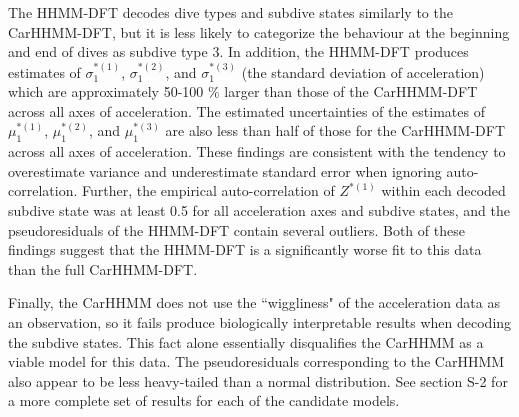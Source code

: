 The HHMM-DFT decodes dive types and subdive states similarly to the CarHHMM-DFT, but it is less likely to categorize the behaviour at the beginning and end of dives as subdive type 3. In addition, the HHMM-DFT produces estimates of $\sigma_1^{*(1)}$, $\sigma_1^{*(2)}$, and $\sigma_1^{*(3)}$ (the standard deviation of acceleration) which are approximately 50-100 \% larger than those of the CarHHMM-DFT across all axes of acceleration. The estimated uncertainties of the estimates of $\mu_1^{*(1)}$, $\mu_1^{*(2)}$, and $\mu_1^{*(3)}$ are also less than half of those for the CarHHMM-DFT across all axes of acceleration. These findings are consistent with the tendency to overestimate variance and underestimate standard error when ignoring auto-correlation. Further, the empirical auto-correlation of $Z^{*(1)}$ within each decoded subdive state was at least 0.5 for all acceleration axes and subdive states, and the pseudoresiduals of the HHMM-DFT contain several outliers. Both of these findings suggest that the HHMM-DFT is a significantly worse fit to this data than the full CarHHMM-DFT.

Finally, the CarHHMM does not use the ``wiggliness" of the acceleration data as an observation, so it fails produce biologically interpretable results when decoding the subdive states. This fact alone essentially disqualifies the CarHHMM as a viable model for this data. The pseudoresiduals corresponding to the CarHHMM also appear to be less heavy-tailed than a normal distribution. See section S-2 for a more complete set of results for each of the candidate models.